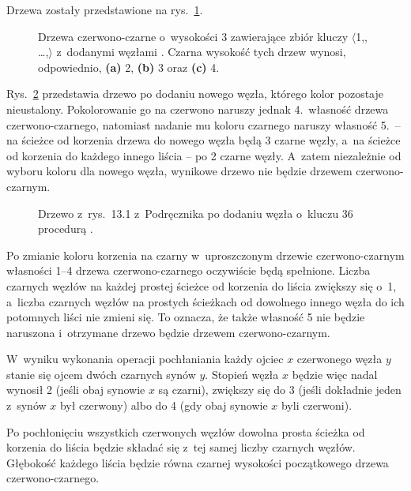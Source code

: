 
\exercise %
Drzewa zostały przedstawione na rys.\ \ref{fig:13.1-1}.
\begin{figure}[ht]
	\centering 
	\caption{Drzewa czerwono-czarne o~wysokości 3 zawierające zbiór kluczy $\langle$1,,\! \dots,$\rangle$ z~dodanymi węzłami .
	Czarna wysokość tych drzew wynosi, odpowiednio, {\sffamily\bfseries(a)} 2, {\sffamily\bfseries(b)} 3 oraz {\sffamily\bfseries(c)} 4.} \label{fig:13.1-1}
\end{figure}

\exercise %
Rys.\ \ref{fig:13.1-2} przedstawia drzewo po dodaniu nowego węzła, którego kolor pozostaje nieustalony.
Pokolorowanie go na czerwono naruszy jednak 4.\ własność drzewa czerwono-czarnego, natomiast nadanie mu koloru czarnego naruszy własność 5.\ -- na ścieżce od korzenia drzewa do nowego węzła będą 3 czarne węzły, a~na ścieżce od korzenia do każdego innego liścia -- po 2 czarne węzły.
A~zatem niezależnie od wyboru koloru dla nowego węzła, wynikowe drzewo nie będzie drzewem czerwono-czarnym.
\begin{figure}[ht]
	\centering 
	\caption{Drzewo z~rys.\ 13.1 z~Podręcznika po dodaniu węzła o~kluczu 36 procedurą .} \label{fig:13.1-2}
\end{figure}

\exercise %
Po zmianie koloru korzenia na czarny w~uproszczonym drzewie czerwono-czarnym własności 1--4 drzewa czerwono-czarnego oczywiście będą spełnione.
Liczba czarnych węzłów na każdej prostej ścieżce od korzenia do liścia zwiększy się o~1, a~liczba czarnych węzłów na prostych ścieżkach od dowolnego innego węzła do ich potomnych liści nie zmieni się.
To oznacza, że także własność 5 nie będzie naruszona i~otrzymane drzewo będzie drzewem czerwono-czarnym.

\exercise %
W~wyniku wykonania operacji pochłaniania każdy ojciec $x$ czerwonego węzła $y$ stanie się ojcem dwóch czarnych synów $y$.
Stopień węzła $x$ będzie więc nadal wynosił 2 (jeśli obaj synowie $x$ są czarni), zwiększy się do 3 (jeśli dokładnie jeden z~synów $x$ był czerwony) albo do 4 (gdy obaj synowie $x$ byli czerwoni).

Po pochłonięciu wszystkich czerwonych węzłów dowolna prosta ścieżka od korzenia do liścia będzie składać się z~tej samej liczby czarnych węzłów.
Głębokość każdego liścia będzie równa czarnej wysokości początkowego drzewa czerwono-czarnego.

